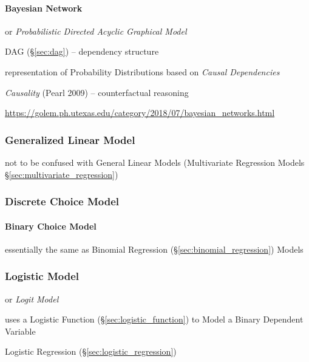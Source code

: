\paragraph{Bayesian Network}\label{sec:bayesian_network}\hfill

or \emph{Probabilistic Directed Acyclic Graphical Model}

DAG (\S\ref{sec:dag}) -- dependency structure

representation of Probability Distributions based on \emph{Causal Dependencies}

\emph{Causality} (Pearl 2009) -- counterfactual reasoning

\url{https://golem.ph.utexas.edu/category/2018/07/bayesian_networks.html}



\subsubsection{Generalized Linear Model}\label{sec:generalized_linear_model}

not to be confused with General Linear Models (Multivariate Regression Models
\S\ref{sec:multivariate_regression})



\subsubsection{Discrete Choice Model}\label{sec:discrete_choice_model}

\paragraph{Binary Choice Model}\label{sec:binary_choice}\hfill

essentially the same as Binomial Regression
(\S\ref{sec:binomial_regression}) Models



\subsubsection{Logistic Model}\label{sec:discrete_uniform_law}

or \emph{Logit Model}

uses a Logistic Function (\S\ref{sec:logistic_function}) to Model a Binary
Dependent Variable

Logistic Regression (\S\ref{sec:logistic_regression})



